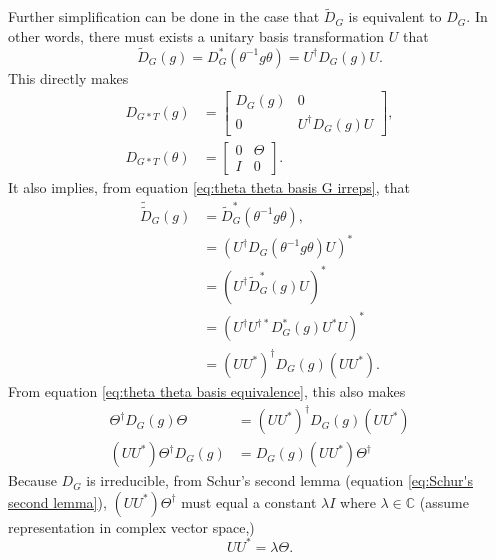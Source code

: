 \documentclass[preprint, 12pt]{revtex4-2}
\numberwithin{equation}{section}
\begin{document}
Further simplification can be done in the case that $\tilde{D}_G$ is equivalent to $D_G$. In other words, there must exists a unitary basis transformation $U$ that
\begin{equation}\label{eq:theta G basis equivalence}
    \tilde{D}_G(g) = D^\ast_G(\theta^{-1}g\theta) = U^\dagger D_G(g)U.
\end{equation}
This directly makes
\begin{equation}\label{eq:G*T Coreps theta equivalence}
    \begin{aligned}
        D_{G\ast T}(g) &=   \begin{bmatrix}
                                D_{G}(g) & 0 \\
                                0 & U^\dagger D_G(g)U  
                            \end{bmatrix}, \\
        D_{G\ast T}(\theta) &=  \begin{bmatrix}
                                    0 & \Theta \\
                                    I & 0 
                                \end{bmatrix}.
    \end{aligned}
\end{equation}
It also implies, from equation \ref{eq:theta theta basis G irreps}, that
\begin{equation}\label{eq:theta theta G basis equivalence}
    \begin{aligned}
        \tilde{\tilde{D}}_G(g) &= \tilde{D}^\ast_G(\theta^{-1}g\theta), \\
        &= \left(U^\dagger D_G(\theta^{-1}g\theta)U\right)^\ast \\
        &= \left(U^\dagger \tilde{D}_G^\ast(g)U\right)^\ast \\
        &= \left(U^\dagger U^{\dagger\ast} D_G^\ast(g)U^\ast U\right)^\ast \\
        &= \left(UU^\ast\right)^\dagger D_G(g)\left(UU^\ast\right).
    \end{aligned}
\end{equation}
From equation \ref{eq:theta theta basis equivalence}, this also makes
\begin{equation}\label{eq:equate G basis equivalence}
    \begin{aligned}
        \Theta^\dagger D_G(g)\Theta &= \left(UU^\ast\right)^\dagger D_G(g)\left(UU^\ast\right) \\
        \left(UU^\ast\right)\Theta^\dagger D_G(g) &=  D_G(g)\left(UU^\ast\right)\Theta^\dagger
    \end{aligned}
\end{equation}
Because $D_G$ is irreducible, from Schur's second lemma (equation \ref{eq:Schur's second lemma}), $\left(UU^\ast\right)\Theta^\dagger$ must equal a constant $\lambda I$ where $\lambda\in\mathbb{C}$ (assume representation in complex vector space,)
\begin{equation}\label{eq:G basis equivalence}
    UU^\ast = \lambda\Theta.
\end{equation}
\end{document}
